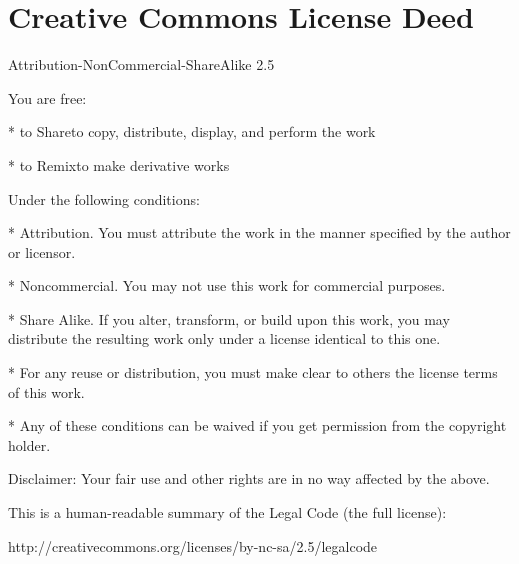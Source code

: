 \section{Creative Commons License Deed}

Attribution-NonCommercial-ShareAlike 2.5

You are free:

* to Share\dash{}to copy, distribute, display, and perform the work

* to Remix\dash{}to make derivative works

Under the following conditions:

* Attribution. You must attribute the work in the manner specified
by the author or licensor.

* Noncommercial. You may not use this work for commercial
purposes.

* Share Alike. If you alter, transform, or build upon this work,
you may distribute the resulting work only under a license
identical to this one.

* For any reuse or distribution, you must make clear to others the
license terms of this work.

* Any of these conditions can be waived if you get permission from
the copyright holder.

Disclaimer: Your fair use and other rights are in no way affected
by the above.

This is a human-readable summary of the Legal Code (the full
license):

http://creativecommons.org/licenses/by-nc-sa/2.5/legalcode


